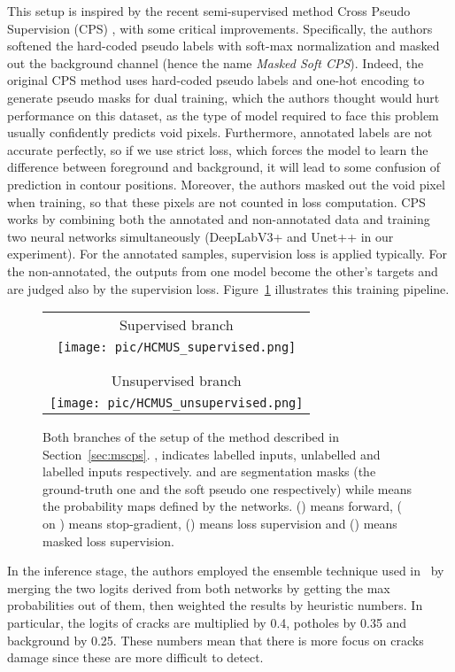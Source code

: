 \documentclass[twocolumn]{article}
\begin{document}
This setup is inspired by the recent semi-supervised method Cross Pseudo Supervision (CPS) \cite{chen2021-CPS}, with some critical improvements. Specifically, the authors softened the hard-coded pseudo labels with soft-max normalization and masked out the background channel (hence the name \emph{Masked Soft CPS}). Indeed, the original CPS method uses hard-coded pseudo labels and one-hot encoding to generate pseudo masks for dual training, which the authors thought would hurt performance on this dataset, as the type of model required to face this problem usually confidently predicts void pixels. Furthermore, annotated labels are not accurate perfectly, so if we use strict loss, which forces the model to learn the difference between foreground and background, it will lead to some confusion of prediction in contour positions. 
Moreover, the authors masked out the void pixel when training, so that these pixels are not counted in loss computation. CPS works by combining both the annotated and non-annotated data and training two neural networks simultaneously (DeepLabV3+ and Unet++ in our experiment). For the annotated samples, supervision loss is applied typically. For the non-annotated, the outputs from one model become the other's targets and are judged also by the supervision loss.
Figure~\ref{fig:HCMUS_2} illustrates this training pipeline.

\begin{figure}[t]
    \centering
    \begin{tabular}{c}
        Supervised branch\\
        \texttt{[image: pic/HCMUS\_supervised.png]}\\ \\ \\
        Unsupervised branch \\
        \texttt{[image: pic/HCMUS\_unsupervised.png]}
    \end{tabular}
    \caption{Both branches of the setup of the \HCMUS{} method described in Section~\ref{sec:mscps}. ,  indicates labelled inputs, unlabelled and labelled inputs respectively.  and  are segmentation masks (the ground-truth one and the soft pseudo one respectively) while  means the probability maps defined by the networks. () means forward, ( on ) means stop-gradient, () means loss supervision and () means masked loss supervision.}
    \label{fig:HCMUS_2}
\end{figure}

In the inference stage, the authors employed the ensemble technique used in~\cite{filipiak2021n} by merging the two logits derived from both networks by getting the max probabilities out of them, then weighted the results by heuristic numbers. In particular, the logits of cracks are multiplied by 0.4, potholes by 0.35 and background by 0.25. These numbers mean that there is more focus on cracks damage since these are more difficult to detect.
\end{document}
